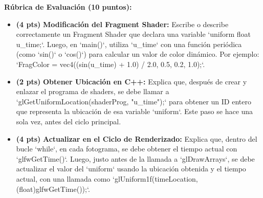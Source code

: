 \documentclass[addpoints,10pt]{exam}
\begin{document}
\begin{questions}
	\begin{solution}[\stretch{3in}]
	\textbf{Rúbrica de Evaluación (10 puntos):}
	\begin{itemize}
		\item \textbf{(4 pts)} \textbf{Modificación del Fragment Shader:} Escribe o describe correctamente un Fragment Shader que declara una variable `uniform float u_time;`. Luego, en `main()`, utiliza `u_time` con una función periódica (como `sin()` o `cos()`) para calcular un valor de color dinámico. Por ejemplo: `FragColor = vec4((sin(u_time) + 1.0) / 2.0, 0.5, 0.2, 1.0);`.
		\item \textbf{(2 pts)} \textbf{Obtener Ubicación en C++:} Explica que, después de crear y enlazar el programa de shaders, se debe llamar a `glGetUniformLocation(shaderProg, "u_time");` para obtener un ID entero que representa la ubicación de esa variable `uniform`. Este paso se hace una sola vez, antes del ciclo principal.
		\item \textbf{(4 pts)} \textbf{Actualizar en el Ciclo de Renderizado:} Explica que, dentro del bucle `while`, en cada fotograma, se debe obtener el tiempo actual con `glfwGetTime()`. Luego, justo antes de la llamada a `glDrawArrays`, se debe actualizar el valor del `uniform` usando la ubicación obtenida y el tiempo actual, con una llamada como `glUniform1f(timeLocation, (float)glfwGetTime());`.
	\end{itemize}
	\end{solution}

	\end{questions}
	
	\begin{center}
		\gradetable[h][questions]
	\end{center}
	
\end{document}
